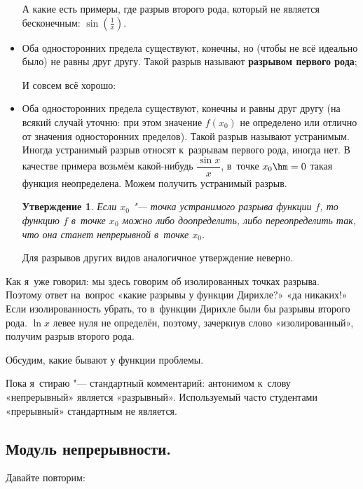 \documentclass[a4paper,10pt,twoside]{article}
\newtheorem{Ut}{Утверждение}[section]
\begin{document}
\begin{itemize}

А какие есть примеры, где разрыв второго рода, который не является бесконечным: $\sin\left(\frac1x\right)$.


\item[1.] Оба односторонних предела существуют, конечны, но (чтобы не всё идеально было) не равны друг другу. Такой разрыв называют \textbf{разрывом первого рода};


И совсем всё хорошо:

\item[0.] Оба односторонних предела существуют, конечны и равны друг другу (на всякий случай уточню: при этом значение $f(x_0)$ не определено
или отлично от значения односторонних пределов). Такой разрыв называют устранимым. Иногда устранимый разрыв относят к~разрывам первого рода, иногда нет.
В качестве примера возьмём какой-нибудь $\dfrac{\sin x}{x}$, в~точке $x_0\hm=0$ такая функция неопределена. Можем получить устранимый разрыв.

\begin{Ut}
Если $x_0$ "--- точка устранимого разрыва функции $f$, то функцию $f$ в~точке $x_0$ можно либо доопределить, либо переопределить так, что она станет непрерывной в~точке $x_0$.
\end{Ut}

Для разрывов других видов аналогичное утверждение неверно.

\end{itemize}

Как я~уже говорил: мы здесь говорим об изолированных точках разрыва. Поэтому ответ на~вопрос «какие разрывы у функции Дирихле?» «да никаких!» Если
изолированность убрать, то в~функции Дирихле были бы разрывы второго рода. $\ln x$ левее нуля не определён, поэтому, зачеркнув слово «изолированный»,
 получим разрыв второго рода.

 Обсудим, какие бывают у функции проблемы.

 Пока я~стираю "--- стандартный комментарий: антонимом к~слову «непрерывный» является «разрывный». Используемый часто студентами «прерывный» стандартным не является.

\subsection{Модуль непрерывности.}
 Давайте повторим:
\end{document}
